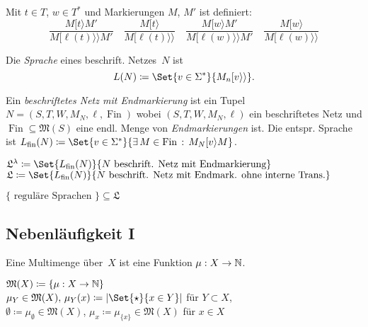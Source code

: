 \documentclass{cheat-sheet}
\newcommand{\activeTransition}[1]{[{#1}\rangle} %
\newcommand{\labelledTransition}[1]{[{#1}\rangle\rangle} %
\newcommand{\inferrule}[2]{\frac{{#1}}{{#2}}} %
\newcommand{\Markings}{\mathfrak{M}} %
\DeclareMathOperator{\Fin}{Fin} %
\newcommand{\Lang}{\mathfrak{L}} %
\newcommand{\fin}{\mathrm{fin}} %
\newcommand{\Multisets}{\mathfrak{M}} %
\begin{document}
\begin{defn}
  Mit $t \in T$, $w \in T^{*}$ und Markierungen $M$, $M'$ ist definiert:
  \[
    \inferrule
      {M \activeTransition{t} M'}
      {M \labelledTransition{\ell(t)} M'} \quad
    \inferrule
      {M \activeTransition{t}}
      {M \labelledTransition{\ell(t)}} \quad
    \inferrule
      {M \activeTransition{w} M'}
      {M \labelledTransition{\ell(w)} M'} \quad
    \inferrule
      {M \activeTransition{w}}
      {M \labelledTransition{\ell(w)}}
  \]
\end{defn}

\begin{defn}
  Die \emph{Sprache} eines beschrift. Netzes~$N$ ist
  \[
    L(N) \coloneqq \Set{v \in \Sigma^{*}}{M_n \labelledTransition{v}}.
  \]
\end{defn}

\begin{defn}
  Ein \emph{beschriftetes Netz mit Endmarkierung} ist ein Tupel $N = (S, T, W, M_N, \ell, \Fin)$ wobei
  $(S, T, W, M_N, \ell)$ ein beschriftetes Netz und
  $\Fin \subseteq \Markings(S)$ eine endl. Menge von \textit{Endmarkierungen} ist.
  Die entspr. Sprache ist $L_\fin(N) \coloneqq \Set{v \in \Sigma^{*}}{\ex{M \in \Fin} M_N \activeTransition{v} M}$.
\end{defn}

\begin{nota}
  $\Lang^\lambda \coloneqq \Set{L_\fin(N)}{N \text{ beschrift. Netz mit Endmarkierung}}$ \\
  $\Lang \coloneqq \Set{L_\fin(N)}{N \text{ beschrift. Netz mit Endmark. ohne interne Trans.}}$
\end{nota}

\begin{satz}
  $\{ \text{ reguläre Sprachen } \} \subseteq \Lang$
\end{satz}

\subsection{Nebenläufigkeit I}

\begin{defn}
  Eine Multimenge über~$X$ ist eine Funktion $\mu : X \to \mathbb{N}$.
\end{defn}

\begin{nota}
  \begin{minipage}[t]{0.8 \linewidth}
    $\Multisets(X) \coloneqq \{ \mu : X \to \N \}$ \\
    $\mu_Y \in \Multisets(X), \, \mu_Y(x) \coloneqq \card{\Set{\star}{x \in Y}}$ für $Y \subset X$, \\
    $\emptyset \coloneqq \mu_\emptyset \in \Multisets(X)$, \enspace
    $\mu_x \coloneqq \mu_{\{ x \}} \in \Multisets(X)$ für $x \in X$
  \end{minipage}
\end{nota}
\end{document}
